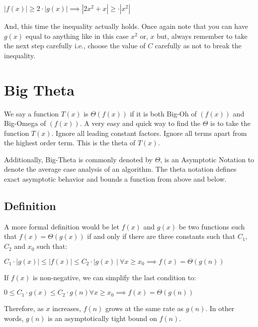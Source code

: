 \documentclass[a4paper,12pt]{article}
\theoremstyle{definition}
\begin{document}
    \begin{center}
        $|f(x)| \geq 2 \cdot |g(x)| \implies |2x^2 + x| \geq \cdot |x^2|$
    \end{center}

    \noindent
    And, this time the inequality actually holds.
    Once again note that you can have $g(x)$ equal to anything like in this case $x^2$ or, $x$ but, always remember
    to take the next step carefully i.e., choose the value of $C$ carefully as not to break the inequality.


    \section{Big Theta}

    We say a function $T(x)$ is $\Theta(f(x))$ if it is both Big-Oh of $(f(x))$ and Big-Omega of $(f(x))$.
    A very easy and quick way to find the $\Theta$ is to take the function $T(x)$. Ignore all leading constant factors.
    Ignore all terms apart from the highest order term.
    This is the theta of $T(x)$.

    Additionally, Big-Theta is commonly denoted by $\Theta$, is an Asymptotic Notation to denote the average case analysis
    of an algorithm.
    The theta notation defines exact asymptotic behavior and bounds a function from above and below.

    \subsection{Definition}

    A more formal definition would be let $f(x)$ and $g(x)$ be two functions such that $f(x) = \Theta(g(x))$ if and only
    if there are three constants such that $C_1$, $C_2$ and $x_0$ such that:

    \begin{center}
        $C_1 \cdot |g(x)| \leq |f(x)| \leq C_2 \cdot |g(x)\ |\ \forall x \geq x_0 \implies f(x) = \Theta(g(n))$
    \end{center}

    \noindent
    If $f(x)$ is non-negative, we can simplify the last condition to:

    \begin{center}
        $0 \leq C_1 \cdot g(x) \leq C_2 \cdot g(n) \forall x \geq x_0 \implies f(x) = \Theta(g(n))$
    \end{center}

    \noindent
    Therefore, as $x$ increases, $f(n)$ grows at the same rate as $g(n)$.
    In other words, $g(n)$ is an asymptotically tight bound on $f(n)$.
\end{document}
